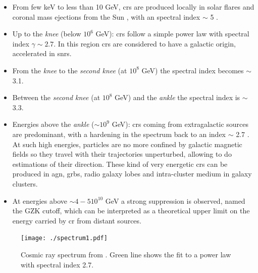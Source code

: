 \documentclass[main.tex]{subfiles}
\begin{document}
\begin{itemize}

    \item From few keV to less than 10 GeV, \glspl{cr} are produced locally in solar flares and coronal mass ejections from the Sun \cite{2017SolarCR_2}, with an spectral index $\sim$ 5 \cite{2017SolarCR}.  
    \item Up to the \textit{knee} (below $10^6$ GeV): \glspl{cr} follow a simple power law with spectral index $\gamma \sim 2.7$. In this region \glspl{cr} are considered to have a galactic origin, accelerated in \glspl{snr}.
    
    \item From the \textit{knee} to the \textit{second knee} (at $10^{8}$ GeV) the spectral index becomes $\sim$ 3.1.
    
    \item Between the \textit{second knee} (at $10^{8}$ GeV) and the \textit{ankle} the spectral index is $\sim$ 3.3.
    

    
    \item Energies above the \textit{ankle} ($\sim 10^{9}$ GeV): \glspl{cr} coming from extragalactic sources are predominant, with a hardening in the spectrum back to an index $\sim$ 2.7 . At such high energies, particles are no more confined by galactic magnetic fields so they travel with their trajectories unperturbed, allowing to do estimations of their direction. These kind of very energetic \glspl{cr} can be produced in \gls{agn}, \glspl{grb}, radio galaxy lobes and intra-cluster medium in galaxy clusters. 
    \item At  energies above $\sim 4-5 10^{10}$ GeV a strong suppression is observed, named the GZK cutoff, which can be interpreted as a theoretical upper limit on the energy carried by \gls{cr} from distant sources. \\
    \end{itemize}
    
    \begin{figure}
        \centering
        \texttt{[image: ./spectrum1.pdf]}
        \caption{Cosmic ray spectrum from \cite{crspec}. Green line shows the fit to a power law with spectral index 2.7.}
        \label{fig:CRspectrum}
    \end{figure}
    
\end{document}
